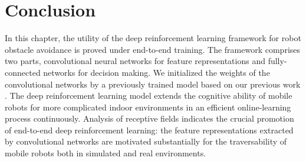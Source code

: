 \section{Conclusion}
\label{sec:ob_conclusion}
In this chapter, the utility of the deep reinforcement learning framework for robot obstacle avoidance is proved under end-to-end training.
The framework comprises two parts, convolutional neural networks for feature representations and fully-connected networks for decision making. We initialized the weights of the convolutional networks by a previously trained model based on our previous work \cite{tai2016deep}. The deep reinforcement learning model extends the cognitive ability of mobile robots for more complicated indoor environments in an efficient online-learning process continuously.
Analysis of receptive fields indicates the crucial promotion of end-to-end deep reinforcement learning: the feature representations extracted by convolutional networks are motivated substantially for the traversability of mobile robots both in simulated and real environments.

